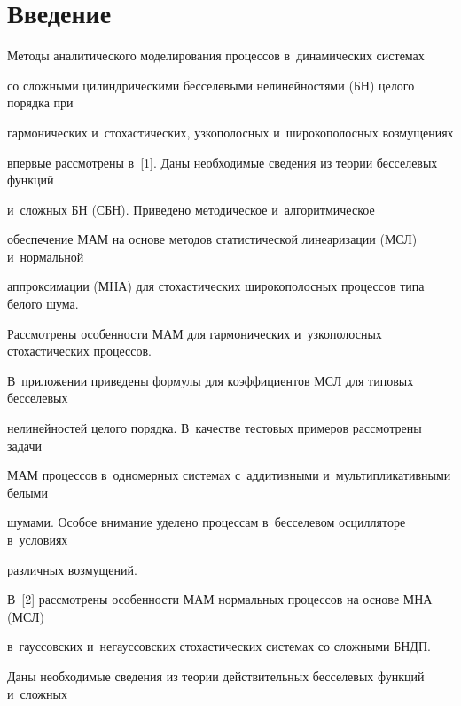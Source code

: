 









      \thispagestyle{headings}

      

      \vspace*{-12pt}



\section{Введение}



Методы аналитического  моделирования  процессов в~динамических системах 

со сложными цилиндрическими бесселевыми нелинейностями (БН) целого порядка при 

гармонических и~стохастических, узкополосных и~широкополосных возмущениях 

впервые рассмотрены в~[1]. Даны необходимые сведения из теории бесселевых функций 

и~сложных БН (СБН). Приведено методическое и~алгоритмическое 

обеспечение МАМ на основе методов статистической линеаризации (МСЛ) и~нормальной 

аппроксимации (МНА) для стохастических широкополосных процессов типа белого шума. 

Рассмотрены особенности МАМ для гармонических и~узкополосных стохастических процессов. 

В~приложении приведены формулы для коэффициентов МСЛ для типовых бесселевых

 нелинейностей целого порядка. В~качестве тестовых примеров рассмотрены задачи 

 МАМ процессов в~одномерных системах с~аддитивными и~мультипликативными белыми 

 шумами. Особое внимание уделено процессам в~бесселевом осцилляторе в~условиях 

 различных возмущений.

В~[2] рассмотрены особенности МАМ нормальных процессов на основе МНА (МСЛ) 

в~гауссовских и~негауссовских стохастических системах со сложными БНДП.

Даны необходимые сведения из теории действительных бесселевых функций и~сложных 

